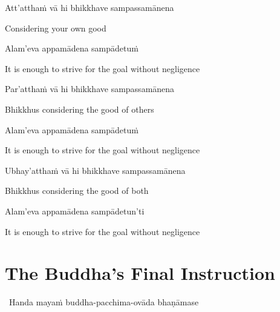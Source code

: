 Att'atthaṁ vā hi bhikkhave sampassamānena

\begin{english}
  Considering your own good
\end{english}

Alam'eva appamādena sampādetuṁ

\begin{english}
  It is enough to strive for the goal without negligence
\end{english}

Par'atthaṁ vā hi bhikkhave sampassamānena

\begin{english}
  Bhikkhus considering the good of others
\end{english}

Alam'eva appamādena sampādetuṁ

\begin{english}
  It is enough to strive for the goal without negligence
\end{english}

Ubhay'atthaṁ vā hi bhikkhave sampassamānena

\begin{english}
  Bhikkhus considering the good of both
\end{english}

Alam'eva appamādena sampādetun'ti\makeatletter\hyperlink{endnote93-appendix}\makeatother

\begin{english}
  It is enough to strive for the goal without negligence
\end{english}

\suttaRef{[SN 12.22]}


\section{The Buddha's Final Instruction}
\label{buddhas-final-instruction}

\begin{leader}
  \anglebracketleft\ \hspace{-0.5mm}Handa mayaṁ buddha-pacchima-ovāda bhaṇāmase \hspace{-0.5mm}\anglebracketright\
\end{leader}

